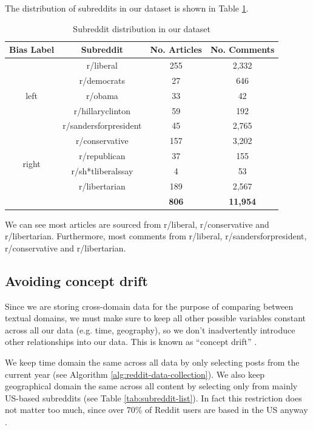 The distribution of subreddits in our dataset is shown in Table \ref{tab:subreddit-distribution}.

\begin{table}[ht]
    \centering
    \begin{tabular}{|c|c|c|c|}
        \hline
        \textbf{Bias Label} & \textbf{Subreddit} & \textbf{No. Articles} & \textbf{No. Comments} \\
        \hline
        \multirow{5}{2em}{left} & r/liberal & 255 & 2,332 \\
        & r/democrats & 27 & 646 \\
        & r/obama & 33 & 42 \\
        & r/hillaryclinton & 59 & 192 \\
        & r/sandersforpresident & 45 & 2,765 \\
        \hline
        \multirow{4}{2em}{right} & r/conservative & 157 & 3,202 \\
        & r/republican & 37 & 155 \\
        & r/sh*tliberalssay & 4 & 53 \\
        & r/libertarian & 189 & 2,567 \\
        \hline
        \multicolumn{2}{c|}{} & \textbf{806} & \textbf{11,954} \\
        \cline{3-4}
    \end{tabular}
    \caption{Subreddit distribution in our dataset}
    \label{tab:subreddit-distribution}
\end{table}

We can see most articles are sourced from r/liberal, r/conservative and r/libertarian. Furthermore, most comments from r/liberal, r/sandersforpresident, r/conservative and r/libertarian.

\subsection{Avoiding concept drift}

Since we are storing cross-domain data for the purpose of comparing between textual domains, we must make sure to keep all other possible variables constant across all our data (e.g. time, geography), so we don't inadvertently introduce other relationships into our data. This is known as ``concept drift'' \cite{concept-drift}.

We keep time domain the same across all data by only selecting posts from the current year (see Algorithm \ref{alg:reddit-data-collection}). We also keep geographical domain the same across all content by selecting only from mainly US-based subreddits (see Table \ref{tab:subreddit-list}). In fact this restriction does not matter too much, since over 70\% of Reddit users are based in the US anyway \cite{sattelberg}.

